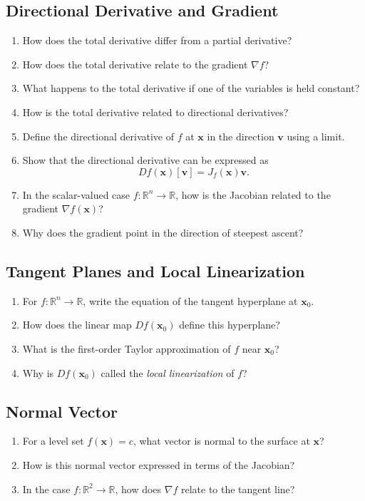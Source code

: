 \subsection{Directional Derivative and Gradient}
\begin{enumerate}[resume]
  \item How does the total derivative differ from a partial derivative?
  \item How does the total derivative relate to the gradient $\nabla f$?
  \item What happens to the total derivative if one of the variables is held constant?
  \item How is the total derivative related to directional derivatives?
  \item Define the directional derivative of $f$ at $\mathbf{x}$ in the direction $\mathbf{v}$ using a limit.
  \item Show that the directional derivative can be expressed as
    \[
      Df(\mathbf{x})[\mathbf{v}] = J_f(\mathbf{x}) \mathbf{v}.
    \]
  \item In the scalar-valued case $f : \mathbb{R}^n \to \mathbb{R}$, how is the Jacobian related to the gradient $\nabla f(\mathbf{x})$?
  \item Why does the gradient point in the direction of steepest ascent?
\end{enumerate}

\subsection{Tangent Planes and Local Linearization}
\begin{enumerate}[resume]
  \item For $f : \mathbb{R}^n \to \mathbb{R}$, write the equation of the tangent hyperplane at $\mathbf{x}_0$.
  \item How does the linear map $Df(\mathbf{x}_0)$ define this hyperplane?
  \item What is the first-order Taylor approximation of $f$ near $\mathbf{x}_0$?
  \item Why is $Df(\mathbf{x}_0)$ called the \emph{local linearization} of $f$?
\end{enumerate}

\subsection{Normal Vector}
\begin{enumerate}[resume]
  \item For a level set $f(\mathbf{x}) = c$, what vector is normal to the surface at $\mathbf{x}$?
  \item How is this normal vector expressed in terms of the Jacobian?
  \item In the case $f : \mathbb{R}^2 \to \mathbb{R}$, how does $\nabla f$ relate to the tangent line?
\end{enumerate}

